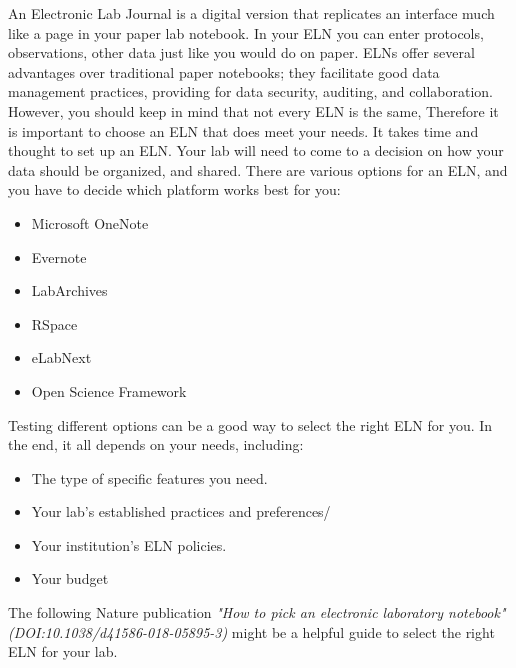 An Electronic Lab Journal is a digital version that replicates an interface much like a page in your paper lab notebook. In your ELN you can enter protocols, observations, other data just like you would do on paper. ELNs offer several advantages over traditional paper notebooks; they facilitate good data management practices, providing for data security, auditing, and collaboration.
\whiteline
However, you should keep in mind that not every ELN is the same, Therefore it is important to choose an ELN that does meet your needs. It takes time and thought to set up an ELN. Your lab will need to come to a decision on how your data should be organized, and shared. 
\whiteline
There are various options for an ELN, and you have to decide which platform works best for you:
\begin{itemize}
\item Microsoft OneNote
\item Evernote
\item LabArchives
\item RSpace
\item eLabNext
\item Open Science Framework
\end{itemize}
\newline
Testing different options can be a good way to select the right ELN for you. In the end, it all depends on your needs, including:
\begin{itemize}
\item The type of specific features you need.
\item Your lab's established practices and preferences/
\item Your institution's ELN policies.
\item Your budget
\end{itemize}
The following Nature publication \textit{"How to pick an electronic laboratory notebook" (DOI:10.1038/d41586-018-05895-3)} might be a helpful guide to select the right ELN for your lab.